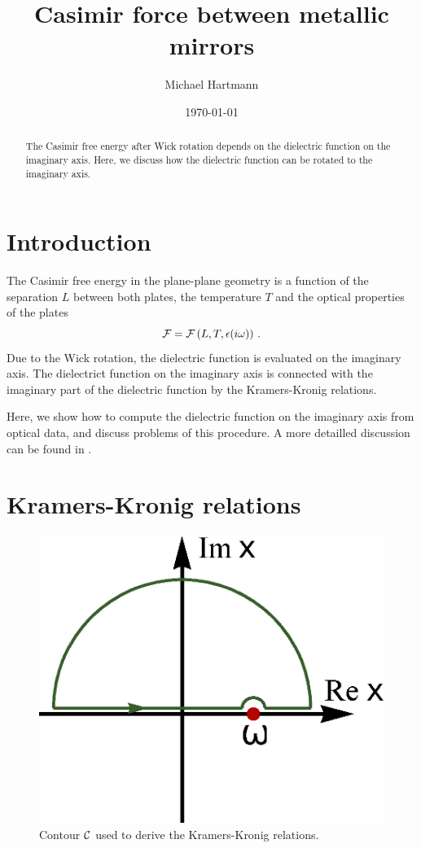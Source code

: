 \documentclass[twocolumn,superscriptaddress,pre]{revtex4-1}
\begin{document}
\title{Casimir force between metallic mirrors}

\author{Michael Hartmann}

\date{\today}

\begin{abstract}
The Casimir free energy after Wick rotation depends on the dielectric function
on the imaginary axis. Here, we discuss how the dielectric function can be
rotated to the imaginary axis.
\end{abstract}

\maketitle

\section{Introduction}

The Casimir free energy in the plane-plane geometry is a function of the
separation $L$ between both plates, the temperature $T$ and the optical
properties of the plates
\begin{equation}
{\cal F} = {\cal F}\left(L,T,\epsilon(i\omega)\right) \,.
\end{equation}
Due to the Wick rotation, the dielectric function is evaluated on the imaginary
axis. The dielectrict function on the imaginary axis is connected with the
imaginary part of the dielectric function by the Kramers-Kronig relations.

Here, we show how to compute the dielectric function on the imaginary axis from
optical data, and discuss problems of this procedure. A more detailled discussion
can be found in \cite{Lambrecht2000}.

\section{Kramers-Kronig relations}

\begin{figure}
\includegraphics[width=0.5\columnwidth]{img/contour.eps}
\caption{Contour $\cal C$ used to derive the Kramers-Kronig relations.}
\label{fig:contour}
\end{figure}
\end{document}
